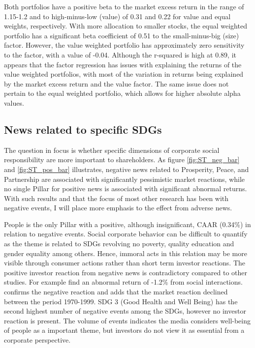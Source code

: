 Both portfolios have a positive beta to the market excess return in the range of 1.15-1.2 and to high-minus-low (value) of 0.31 and 0.22 for value and equal weights, respectively. With more allocation to smaller stocks, the equal weighted portfolio has a significant beta coefficient of 0.51 to the small-minus-big (size) factor. However, the value weighted portfolio has approximately zero sensitivity to the factor, with a value of -0.04. Although the r-squared is high at 0.89, it appears that the factor regression has issues with explaining the returns of the value weighted portfolios, with most of the variation in returns being explained by the market excess return and the value factor. The same issue does not pertain to the equal weighted portfolio, which allows for higher absolute alpha values. 

\subsection{News related to specific SDGs} \label{sec: short_term_analysis_SDG}

The question in focus is whether specific dimensions of corporate social responsibility are more important to shareholders. As figure \ref{fig:ST_neg_bar} and \ref{fig:ST_pos_bar} illustrates, negative news related to Prosperity, Peace, and Partnership are associated with significantly pessimistic market reactions, while no single Pillar for positive news is associated with significant abnormal returns. With such results and that the focus of most other research has been with negative events, I will place more emphasis to the effect from adverse news.

People is the only Pillar with a positive, although insignificant, CAAR (0.34\%) in relation to negative events. Social corporate behavior can be difficult to quantify as the theme is related to SDGs revolving no poverty, quality education and gender equality among others. Hence, immoral acts in this relation may be more visible through consumer actions rather than short term investor reactions. The positive investor reaction from negative news is contradictory compared to other studies. For example \cite{chen2001layoffs} find an abnormal return of -1.2\% from social interactions. \citep{farber2009changing} confirms the negative reaction and adds that the market reaction declined between the period 1970-1999. SDG 3 (Good Health and Well Being) has the second highest number of negative events among the SDGs, however no investor reaction is present. The volume of events indicates the media considers well-being of people as a important theme, but investors do not view it as essential from a corporate perspective.

